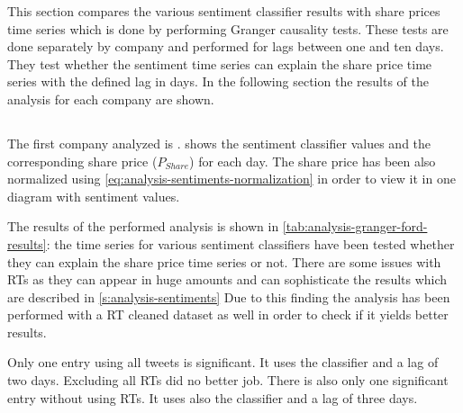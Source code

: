 This section compares the various sentiment classifier results with share prices time series which is done by performing Granger causality tests.
These tests are done separately by company and performed for lags between one and ten days.
They test whether the sentiment time series can explain the share price time series with the defined lag in days.
In the following section the results of the analysis for each company are shown.

\subsection{\ford}
\label{ss:analysis-granger-ford}

The first company analyzed is \ford{}.
 shows the sentiment classifier values and the corresponding share price ($P_{Share}$) for each day.
The share price has been also normalized using \cref{eq:analysis-sentiments-normalization} in order to view it in one diagram with sentiment values.

\begin{figure}[hbt]
    \centering
    
    \caption{\resultsCaption{\ford}}
    \label{fig:analysis-results-ford}
\end{figure} 

The results of the performed analysis is shown in \cref{tab:analysis-granger-ford-results}: 
the time series for various sentiment classifiers have been tested whether they can explain the share price time series or not.
There are some issues with \acp{RT} as they can appear in huge amounts and can sophisticate the results which are described in \cref{s:analysis-sentiments}
Due to this finding the analysis has been performed with a \ac{RT} cleaned dataset as well in order to check if it yields better results.

Only one entry using all tweets is significant.
It uses the \nb{} classifier and a lag of two days.
Excluding all \acp{RT} did no better job.
There is also only one significant entry without using \acp{RT}.
It uses also the \nb{} classifier and a lag of three days.



